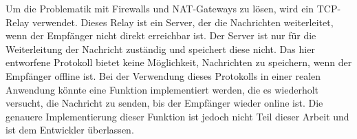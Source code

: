 Um die Problematik mit Firewalls und NAT-Gateways zu lösen, wird ein TCP-Relay verwendet. Dieses Relay ist ein Server, der die Nachrichten weiterleitet, wenn der Empfänger nicht direkt erreichbar ist. Der Server ist nur für die Weiterleitung der Nachricht zuständig und speichert diese nicht. Das hier entworfene Protokoll bietet keine Möglichkeit, Nachrichten zu speichern, wenn der Empfänger offline ist. Bei der Verwendung dieses Protokolls in einer realen Anwendung könnte eine Funktion implementiert werden, die es wiederholt versucht, die Nachricht zu senden, bis der Empfänger wieder online ist. Die genauere Implementierung dieser Funktion ist jedoch nicht Teil dieser Arbeit und ist dem Entwickler überlassen.


